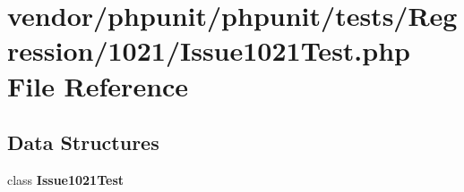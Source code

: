\section{vendor/phpunit/phpunit/tests/\+Regression/1021/\+Issue1021\+Test.php File Reference}
\label{_issue1021_test_8php}
\subsection*{Data Structures}
\begin{DoxyCompactItemize}
\item 
class {\bf Issue1021\+Test}
\end{DoxyCompactItemize}
